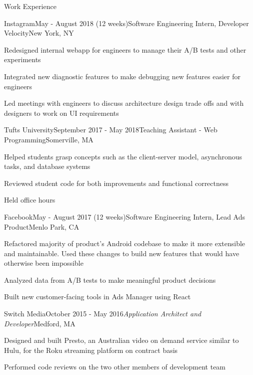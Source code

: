 \documentclass{resume}
\begin{document}
  \begin{rSection}{Work Experience}
  
   	\begin{rSubsection}{Instagram}{May - August 2018 (12 weeks)}{Software Engineering Intern, Developer Velocity}{New York, NY}
  	\item Redesigned internal webapp for engineers to manage their A/B tests and other experiments
    \item Integrated new diagnostic features to make debugging new features easier for engineers
    \item Led meetings with engineers to discuss architecture design trade offs and with designers to work on UI requirements
    \end{rSubsection}
  
  \begin{rSubsection}{Tufts University}{September 2017 - May 2018}{Teaching Assistant - Web Programming}{Somerville, MA}
    \item Helped students grasp concepts such as the client-server model, asynchronous tasks, and database systems
    \item Reviewed student code for both improvements and functional correctness
    \item Held office hours
    \end{rSubsection}
  
  	\begin{rSubsection}{Facebook}{May - August 2017 (12 weeks)}{Software Engineering Intern, Lead Ads Product}{Menlo Park, CA}
  	\item Refactored majority of product's Android codebase to make it more extensible and maintainable. Used these changes to build new features that would have otherwise been impossible
    \item Analyzed data from A/B tests to make meaningful product decisions
    \item Built new customer-facing tools in Ads Manager using React
    \end{rSubsection}
    

   \begin{rSubsection}{Switch Media}{October 2015 - May 2016}{\normalfont\em Application Architect and Developer}{\hfill Medford, MA}
    \item Designed and built Presto, an Australian video on demand service similar to Hulu, for the Roku streaming platform on contract basis
    \item Performed code reviews on the two other members of development team
    \end{rSubsection}
    

\end{rSection}
\end{document}
